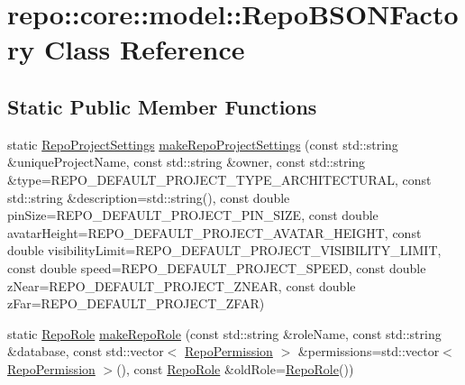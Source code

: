 \hypertarget{classrepo_1_1core_1_1model_1_1_repo_b_s_o_n_factory}{}\section{repo\+:\+:core\+:\+:model\+:\+:Repo\+B\+S\+O\+N\+Factory Class Reference}
\label{classrepo_1_1core_1_1model_1_1_repo_b_s_o_n_factory}
\subsection*{Static Public Member Functions}
\begin{DoxyCompactItemize}
\item 
static \hyperlink{classrepo_1_1core_1_1model_1_1_repo_project_settings}{Repo\+Project\+Settings} \hyperlink{classrepo_1_1core_1_1model_1_1_repo_b_s_o_n_factory_aaeeeab32a5d425b9c16ebdcbc423f1fe}{make\+Repo\+Project\+Settings} (const std\+::string \&unique\+Project\+Name, const std\+::string \&owner, const std\+::string \&type=R\+E\+P\+O\+\_\+\+D\+E\+F\+A\+U\+L\+T\+\_\+\+P\+R\+O\+J\+E\+C\+T\+\_\+\+T\+Y\+P\+E\+\_\+\+A\+R\+C\+H\+I\+T\+E\+C\+T\+U\+R\+A\+L, const std\+::string \&description=std\+::string(), const double pin\+Size=R\+E\+P\+O\+\_\+\+D\+E\+F\+A\+U\+L\+T\+\_\+\+P\+R\+O\+J\+E\+C\+T\+\_\+\+P\+I\+N\+\_\+\+S\+I\+Z\+E, const double avatar\+Height=R\+E\+P\+O\+\_\+\+D\+E\+F\+A\+U\+L\+T\+\_\+\+P\+R\+O\+J\+E\+C\+T\+\_\+\+A\+V\+A\+T\+A\+R\+\_\+\+H\+E\+I\+G\+H\+T, const double visibility\+Limit=R\+E\+P\+O\+\_\+\+D\+E\+F\+A\+U\+L\+T\+\_\+\+P\+R\+O\+J\+E\+C\+T\+\_\+\+V\+I\+S\+I\+B\+I\+L\+I\+T\+Y\+\_\+\+L\+I\+M\+I\+T, const double speed=R\+E\+P\+O\+\_\+\+D\+E\+F\+A\+U\+L\+T\+\_\+\+P\+R\+O\+J\+E\+C\+T\+\_\+\+S\+P\+E\+E\+D, const double z\+Near=R\+E\+P\+O\+\_\+\+D\+E\+F\+A\+U\+L\+T\+\_\+\+P\+R\+O\+J\+E\+C\+T\+\_\+\+Z\+N\+E\+A\+R, const double z\+Far=R\+E\+P\+O\+\_\+\+D\+E\+F\+A\+U\+L\+T\+\_\+\+P\+R\+O\+J\+E\+C\+T\+\_\+\+Z\+F\+A\+R)
\item 
static \hyperlink{classrepo_1_1core_1_1model_1_1_repo_role}{Repo\+Role} \hyperlink{classrepo_1_1core_1_1model_1_1_repo_b_s_o_n_factory_a6adaa268d88e85b45c461f2385715bf2}{make\+Repo\+Role} (const std\+::string \&role\+Name, const std\+::string \&database, const std\+::vector$<$ \hyperlink{structrepo_1_1core_1_1model_1_1_repo_permission}{Repo\+Permission} $>$ \&permissions=std\+::vector$<$ \hyperlink{structrepo_1_1core_1_1model_1_1_repo_permission}{Repo\+Permission} $>$(), const \hyperlink{classrepo_1_1core_1_1model_1_1_repo_role}{Repo\+Role} \&old\+Role=\hyperlink{classrepo_1_1core_1_1model_1_1_repo_role}{Repo\+Role}())

\end{DoxyCompactItemize}
